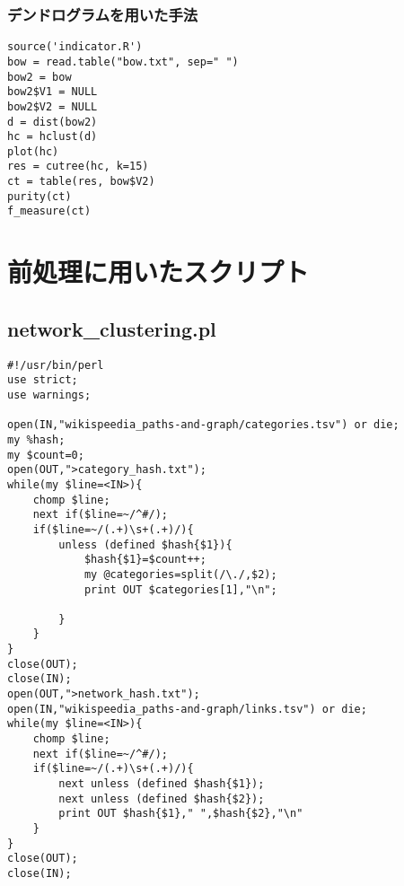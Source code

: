 \documentclass{jsarticle}
\begin{document}
\subsubsection{デンドログラムを用いた手法}
\begin{lstlisting}[basicstyle=\ttfamily\footnotesize, frame=single]
source('indicator.R')
bow = read.table("bow.txt", sep=" ")
bow2 = bow
bow2$V1 = NULL
bow2$V2 = NULL
d = dist(bow2)
hc = hclust(d)
plot(hc)
res = cutree(hc, k=15)
ct = table(res, bow$V2)
purity(ct)
f_measure(ct)
\end{lstlisting}
\section{前処理に用いたスクリプト}
\subsection{network\_clustering.pl}
\begin{lstlisting}[basicstyle=\ttfamily\footnotesize, frame=single]
#!/usr/bin/perl
use strict;
use warnings;

open(IN,"wikispeedia_paths-and-graph/categories.tsv") or die;
my %hash;
my $count=0;
open(OUT,">category_hash.txt");
while(my $line=<IN>){
	chomp $line;
	next if($line=~/^#/);
	if($line=~/(.+)\s+(.+)/){
		unless (defined $hash{$1}){
			$hash{$1}=$count++;
			my @categories=split(/\./,$2);
			print OUT $categories[1],"\n";

		}
	}
}
close(OUT);
close(IN);
open(OUT,">network_hash.txt");
open(IN,"wikispeedia_paths-and-graph/links.tsv") or die;
while(my $line=<IN>){
	chomp $line;
	next if($line=~/^#/);
	if($line=~/(.+)\s+(.+)/){
		next unless (defined $hash{$1});
		next unless (defined $hash{$2});
		print OUT $hash{$1}," ",$hash{$2},"\n"
	}
}
close(OUT);
close(IN);
\end{lstlisting}
\end{document}
